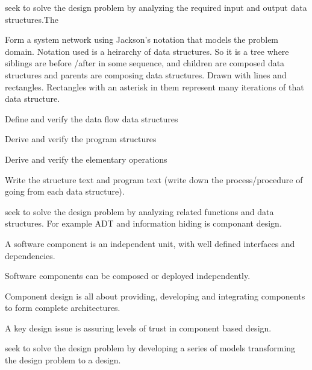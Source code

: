 \begin{compactitem}
\item {} seek to solve the design
problem by analyzing the required input and output data structures.The
\begin{compactitem} 
\item Form a system network using Jackson’s notation that
models the problem domain. Notation used is a heirarchy of data structures. So it is a tree where siblings are before /after in some sequence, and children are composed data structures and parents are composing data structures. Drawn with lines and rectangles. Rectangles with an asterisk in them represent many iterations of that data structure.   
\item Define and verify the data flow data structures
\item Derive and verify the program structures
\item Derive and verify the elementary operations
\item Write the structure text and program text (write down the process/procedure of going from each data structure).
\end{compactitem}

\item {} seek to solve the
design problem by analyzing related functions and data structures. For example ADT and information hiding is componant design. 
\begin{compactitem}
\item A
software component
is an independent unit, with well
defined interfaces and dependencies. 
\item Software components can be composed or deployed
independently. 
\item Component design is all about providing, developing and
integrating components to form complete architectures.
\item A key design issue is
assuring
levels of trust in
component based design.
\end{compactitem}

\item {} seek to solve the design
problem by developing a series of models transforming the design problem to a
design. 
\end{compactitem}

